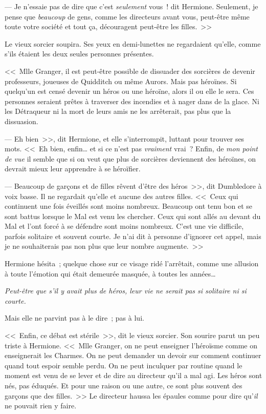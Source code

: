 --- Je n'essaie pas de dire que c'est \emph{seulement} vous~! dit Hermione. Seulement, je pense que \emph{beaucoup} de gens, comme les directeurs avant vous, peut-être même toute votre société et tout ça, découragent peut-être les filles.~>>

Le vieux sorcier soupira. Ses yeux en demi-lunettes ne regardaient qu'elle, comme s'ils étaient les deux seules personnes présentes.

<<~Mlle Granger, il est peut-être possible de dissuader des sorcières de devenir professeurs, joueuses de Quidditch ou même Aurors. Mais pas héroïnes. Si quelqu'un est censé devenir un héros ou une héroïne, alors il ou elle le sera. Ces personnes seraient prêtes à traverser des incendies et à nager dans de la glace. Ni les Détraqueur ni la mort de leurs amis ne les arrêterait, pas plus que la dissuasion.

--- Eh bien~>>, dit Hermione, et elle s'interrompit, luttant pour trouver ses mots. <<~Eh bien, enfin… et si ce n'est pas \emph{vraiment} vrai~? Enfin, de \emph{mon point de vue} il semble que si on veut que plus de sorcières deviennent des héroïnes, on devrait mieux leur apprendre à se héroïfier.

--- Beaucoup de garçons et de filles rêvent d'être des héros~>>, dit Dumbledore à voix basse. Il ne regardait qu'elle et aucune des autres filles. <<~Ceux qui continuent une fois éveillés sont moins nombreux. Beaucoup ont tenu bon et se sont battus lorsque le Mal est venu les chercher. Ceux qui sont allés au devant du Mal et l'ont forcé à se défendre sont moins nombreux. C'est une vie difficile, parfois solitaire et souvent courte. Je n'ai dit à personne d'ignorer cet appel, mais je ne souhaiterais pas non plus que leur nombre augmente.~>>

Hermione hésita~; quelque chose sur ce visage ridé l'arrêtait, comme une allusion à toute l'émotion qui était demeurée masquée, à toutes les années…

\emph{Peut-être que s'il y avait plus de héros, leur vie ne serait pas si solitaire ni si courte.}

Mais elle ne parvint pas à le dire~; pas à lui.

<<~Enfin, ce débat est stérile~>>, dit le vieux sorcier. Son sourire parut un peu triste à Hermione. <<~Mlle Granger, on ne peut enseigner l'héroïsme comme on enseignerait les Charmes. On ne peut demander un devoir sur comment continuer quand tout espoir semble perdu. On ne peut inculquer par routine quand le moment est venu de se lever et de dire au directeur qu'il a mal agi. Les héros sont nés, pas éduqués. Et pour une raison ou une autre, ce sont plus souvent des garçons que des filles.~>> Le directeur haussa les épaules comme pour dire qu'\emph{il} ne pouvait rien y faire.

